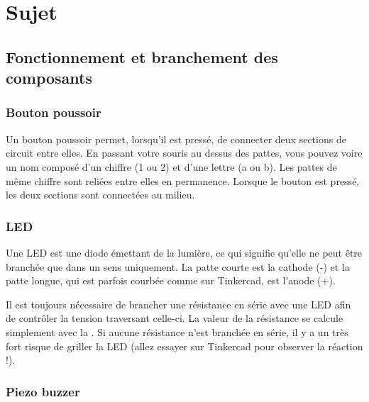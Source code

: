 \section{Sujet}

\subsection{Fonctionnement et branchement des composants}

\subsubsection{Bouton poussoir}

Un bouton poussoir permet, lorsqu'il est pressé, de connecter deux sections de circuit entre elles.
En passant votre souris au dessus des pattes, vous pouvez voire un nom composé d'un chiffre (1 ou 2) et d'une lettre (a ou b).
Les pattes de même chiffre sont reliées entre elles en permanence.
Lorsque le bouton est pressé, les deux sections sont connectées au milieu.


\subsubsection{LED}

Une LED est une diode émettant de la lumière, ce qui signifie qu'elle ne peut être branchée que dans un sens uniquement.
La patte courte est la cathode (-) et la patte longue, qui est parfois courbée comme sur Tinkercad, est l'anode (+).

Il est toujours nécessaire de brancher une résistance en série avec une LED afin de contrôler la tension traversant celle-ci.
La valeur de la résistance se calcule simplement avec la .
Si aucune résistance n'est branchée en série, il y a un très fort risque de griller la LED (allez essayer sur Tinkercad pour observer la réaction !).



\subsubsection{Piezo buzzer}

